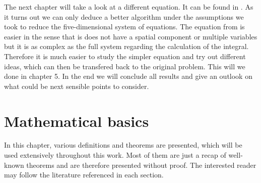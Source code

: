 \documentclass[12pt,a4paper,twoside, open=right]{scrreprt}
\theoremstyle{definition}
\theoremstyle{plain}
\begin{document}
\par
The next chapter will take a look at a different equation. It can be found in \cite{Goetze1995}. As it turns out we can only deduce a better algorithm under the assumptions we took to reduce the five-dimensional system of equations. The equation from \cite{Goetze1995} is easier in the sense that is does not have a spatial component or multiple variables but it is as complex as the full system regarding the calculation of the integral. Therefore it is much easier to study the simpler equation and try out different ideas, which can then be transfered back to the original problem. This will we done in chapter 5. 
In the end we will conclude all results and give an outlook on what could be next sensible points to consider.\\
\par
\newpage
\chapter{Mathematical basics}
In this chapter, various definitions and theorems are presented, which will be used extensively throughout this work. Most of them are just a recap of well-known theorems and are therefore presented without proof. The interested reader may follow the literature referenced in each section.
\end{document}
